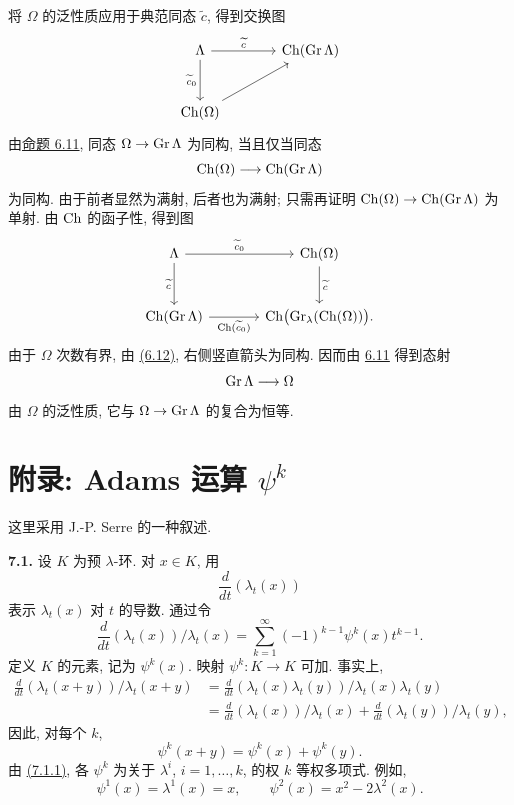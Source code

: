 将 \(\Omega\) 的泛性质应用于典范同态 \(\widetilde c\), 得到交换图
\[
\begin{tikzcd}[column sep=large,row sep=large]
\Lambda \arrow[r,"\widetilde c"] \arrow[d,"\widetilde c_0"'] &
\Ch(\Gr\Lambda)\\
\Ch(\Omega) \arrow[ur] &
\end{tikzcd}
\]
由\hyperlink{sga6.e05.prop.6-11}{命题 6.11}, 同态 \(\Omega\to\operatorname{Gr}\Lambda\) 为同构, 当且仅当同态
\[
  \operatorname{Ch}(\Omega)\longrightarrow \operatorname{Ch}(\operatorname{Gr}\Lambda)
\]
为同构. 由于前者显然为满射, 后者也为满射; 只需再证明
\(\operatorname{Ch}(\Omega)\to\operatorname{Ch}(\operatorname{Gr}\Lambda)\) 为单射. 由 \(\operatorname{Ch}\) 的函子性, 得到图
\[
\begin{tikzcd}[column sep=large,row sep=large]
\Lambda \arrow[r,"\widetilde c_0"] \arrow[d,"\widetilde c"'] &
\Ch(\Omega) \arrow[d,"\widetilde c"]\\
\Ch(\Gr\Lambda) \arrow[r,"\Ch(\widetilde c_0)"'] &
\Ch\bigl(\Gr_\lambda(\Ch(\Omega))\bigr).
\end{tikzcd}
\]
由于 \(\Omega\) 次数有界, 由 \hyperlink{sga6.e05.cor.6-12}{(6.12)}, 右侧竖直箭头为同构. 因而由 \hyperlink{sga6.e05.prop.6-11}{6.11} 得到态射
\[
  \operatorname{Gr}\Lambda\longrightarrow\Omega
\]
由 \(\Omega\) 的泛性质, 它与 \(\Omega\to\operatorname{Gr}\Lambda\) 的复合为恒等.

\section*{附录: Adams 运算 \(\psi^k\)}

这里采用 J.-P. Serre 的一种叙述.

\textbf{7.1.} 设 \(K\) 为预 \(\lambda\)-环. 对 \(x\in K\), 用
\[
  \frac{d}{dt}(\lambda_t(x))
\]
表示 \(\lambda_t(x)\) 对 \(t\) 的导数. 通过令
\begin{equation}\tag{7.1.1}
  \frac{d}{dt}(\lambda_t(x))/\lambda_t(x)
  =
  \sum_{k=1}^{\infty}(-1)^{k-1}\psi^k(x)t^{k-1}.
\end{equation}
定义 \(K\) 的元素, 记为 \(\psi^k(x)\). 映射 \(\psi^k:K\to K\) 可加. 事实上,
\[
\begin{aligned}
 \frac{d}{dt}(\lambda_t(x+y))/\lambda_t(x+y)
 &=
 \frac{d}{dt}(\lambda_t(x)\lambda_t(y))/\lambda_t(x)\lambda_t(y)\\
 &=
 \frac{d}{dt}(\lambda_t(x))/\lambda_t(x)
 +\frac{d}{dt}(\lambda_t(y))/\lambda_t(y),
\end{aligned}
\]
因此, 对每个 \(k\),
\[
  \psi^k(x+y)=\psi^k(x)+\psi^k(y).
\]
由 \hyperlink{sga6.e05.eq.7-1-1}{(7.1.1)}, 各 \(\psi^k\) 为关于 \(\lambda^i\), \(i=1,\ldots,k\), 的权 \(k\) 等权多项式. 例如,
\[
  \psi^1(x)=\lambda^1(x)=x,
  \qquad
  \psi^2(x)=x^2-2\lambda^2(x).
\]

